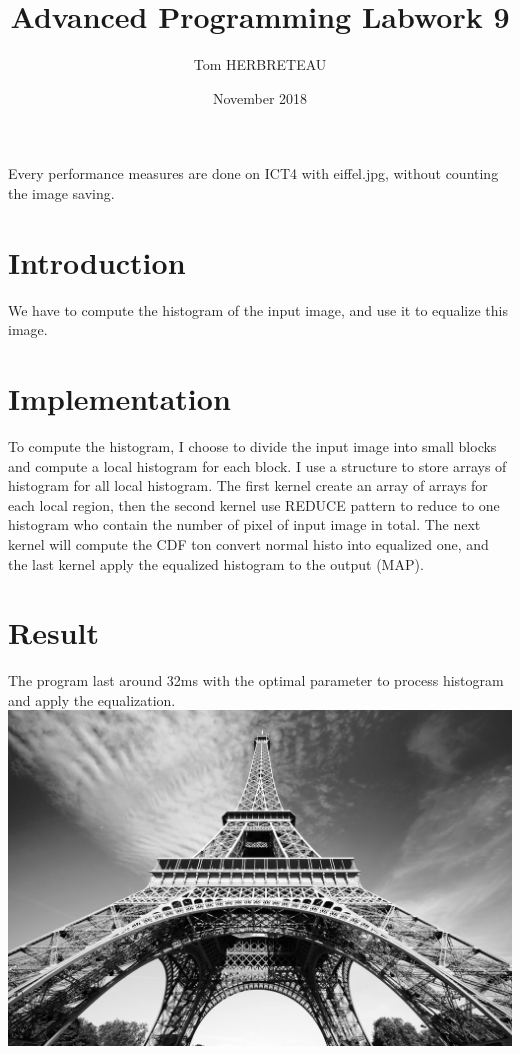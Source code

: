 \documentclass{article}
\title{Advanced Programming Labwork 9}
\author{Tom HERBRETEAU }
\date{November 2018}
\begin{document}
\maketitle
Every performance measures are done on ICT4 with eiffel.jpg, without counting the image saving.
\section{Introduction}
We have to compute the histogram of the input image, and use it to equalize this image.
\section{Implementation}
To compute the histogram, I choose to divide the input image into small blocks and compute a local histogram for each block. I use a structure to store arrays of histogram for all local histogram. The first kernel create an array of arrays for each local region, then the second kernel use REDUCE pattern to reduce to one histogram who contain the number of pixel of input image in total.
The next kernel will compute the CDF ton convert normal histo into equalized one, and the last kernel apply the equalized histogram to the output (MAP).
\section{Result}
\newline
The program last around 32ms with the optimal parameter to process histogram and apply the equalization.
\newline
\includegraphics[width=\textwidth]{labwork9-gpu-out.jpg}

\end{document}
